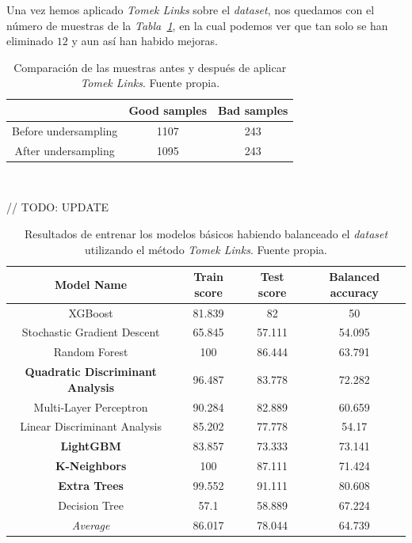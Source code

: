 Una vez hemos aplicado \textit{Tomek Links} sobre el \textit{dataset}, nos quedamos con el número de muestras de la \textit{Tabla\ \ref{tab:balance-tl-comparison}}, en la cual podemos ver que tan solo se han eliminado $12$ y aun así han habido mejoras.

\begin{table}[!h]
    \centering
    \begin{tabular}{|c|cc|} \hline
        & Good samples & Bad samples \\ \hline
        Before undersampling & 1107 & 243 \\
        After undersampling & 1095 & 243 \\ \hline
    \end{tabular}
    \caption{Comparación de las muestras antes y después de aplicar \textit{Tomek Links}. Fuente propia.}\ \label{tab:balance-tl-comparison}
\end{table}

// TODO: UPDATE

\begin{table}[!h]
    \centering
    \begin{tabular}{|c|ccc|}
    \hline
        Model Name & Train score & Test score & Balanced accuracy \\ \hline
        XGBoost & 81.839 & 82 & 50 \\ 
        Stochastic Gradient Descent & 65.845 & 57.111 & 54.095 \\ 
        Random Forest & 100 & 86.444 & 63.791 \\ 
        \textbf{Quadratic Discriminant Analysis} & 96.487 & 83.778 & 72.282 \\ 
        Multi-Layer Perceptron & 90.284 & 82.889 & 60.659 \\ 
        Linear Discriminant Analysis & 85.202 & 77.778 & 54.17 \\ 
        \textbf{LightGBM} & 83.857 & 73.333 & 73.141 \\ 
        \textbf{K-Neighbors} & 100 & 87.111 & 71.424 \\ 
        \textbf{Extra Trees} & 99.552 & 91.111 & 80.608 \\ 
        Decision Tree & 57.1 & 58.889 & 67.224 \\ \hline
        \textit{Average} & 86.017 & 78.044 & 64.739 \\ \hline
    \end{tabular}
    \caption{Resultados de entrenar los modelos básicos habiendo balanceado el \textit{dataset} utilizando el método \textit{Tomek Links}. Fuente propia.}\ \label{tab:tomeklinks-basic-training}
\end{table}

